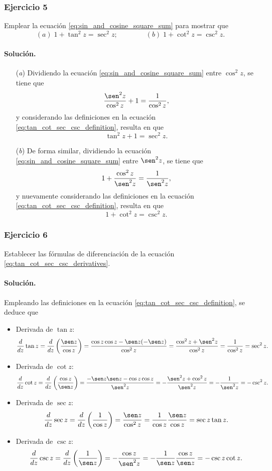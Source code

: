 \documentclass[a4paper]{report}
\begin{document}
\subsubsection{Ejercicio 5}

Emplear la ecuación \ref{eq:sin_and_cosine_square_sum} para mostrar que 
\[
 (\textit{a})\;1+\tan^2z=\sec^2z;\qquad\qquad (\textit{b})\;1+\cot^2z=\csc^2z.
\]

\paragraph{Solución.} 

\begin{enumerate}
 \item[(\textit{a})] Dividiendo la ecuación \ref{eq:sin_and_cosine_square_sum} entre \(\cos^2z\), se tiene que 
 \[
  \frac{\sen^2z}{\cos^2z}+1=\frac{1}{\cos^2z},
 \]
 y considerando las definiciones en la ecuación \ref{eq:tan_cot_sec_csc_definition}, resulta en que 
 \[
  \tan^2z+1=\sec^2z.
 \]
 \item[(\textit{b})] De forma similar, dividiendo la ecuación \ref{eq:sin_and_cosine_square_sum} entre \(\sen^2z\), se tiene que
 \[
  1+\frac{\cos^2z}{\sen^2z}=\frac{1}{\sen^2z},
 \]
 y nuevamente considerando las definiciones en la ecuación \ref{eq:tan_cot_sec_csc_definition}, resulta en que 
 \[
  1+\cot^2z=\csc^2z.
 \]
\end{enumerate}

\subsubsection{Ejercicio 6}

Establecer las fórmulas de diferenciación de la ecuación \ref{eq:tan_cot_sec_csc_derivatives}.

\paragraph{Solución.} Empleando las definiciones en la ecuación \ref{eq:tan_cot_sec_csc_definition}, se deduce que 
\begin{itemize}
 \item Derivada de \(\tan z\):
 \[
  \frac{d}{dz}\tan z=\frac{d}{dz}\left(\frac{\sen z}{\cos z}\right)
  =\frac{\cos z\cos z-\sen z(-\sen z)}{\cos^2z}
  =\frac{\cos^2z+\sen^2z}{\cos^2z}=\frac{1}{\cos^2z}=\sec^2z.
 \]
 \item Derivada de \(\cot z\):
 \[
  \frac{d}{dz}\cot z=\frac{d}{dz}\left(\frac{\cos z}{\sen z}\right)
  =\frac{-\sen z\sen z-\cos z\cos z}{\sen^2z}
  =-\frac{\sen^2z+\cos^2z}{\sen^2z}=-\frac{1}{\sen^2z}=-\csc^2z.
 \]
 \item Derivada de \(\sec z\):
 \[
  \frac{d}{dz}\sec z=\frac{d}{dz}\left(\frac{1}{\cos z}\right)=\frac{\sen z}{\cos^2z}=\frac{1}{\cos z}\frac{\sen z}{\cos z}=\sec z\tan z.
 \]
  \item Derivada de \(\csc z\):
 \[
  \frac{d}{dz}\csc z=\frac{d}{dz}\left(\frac{1}{\sen z}\right)=-\frac{\cos z}{\sen^2z}=-\frac{1}{\sen z}\frac{\cos z}{\sen z}=-\csc z\cot z.
 \]
\end{itemize}
\end{document}

